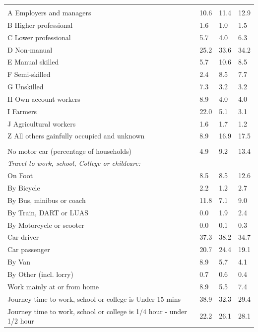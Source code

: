 \documentclass{article}
\begin{document}
\begin{table}[h]
\begin{tabular}{KTTT}
\hline
    \\ 
    \hline
A Employers and managers & 10.6& 11.4& 12.9\\
B Higher professional & 1.6& 1.0& 1.5\\
C Lower professional & 5.7& 4.0& 6.3\\
D Non-manual & 25.2& 33.6& 34.2\\
E Manual skilled &  5.7& 10.6&  8.5\\
F Semi-skilled & 2.4& 8.5& 7.7\\
G Unskilled & 7.3& 3.2& 3.2\\
H Own account workers & 8.9& 4.0& 4.0\\
I Farmers & 22.0&  5.1&  3.1\\
J Agricultural workers & 1.6& 1.7& 1.2\\
Z All others gainfully occupied and unknown &  8.9& 16.9& 17.5\\
\hline
{}\hline
    \\ 
    \hline
No motor car (percentage of households) &  4.9&  9.2& 
13.4\\
    \hline
\emph{Travel to work, school, College or childcare:} & & & \\
\quad On Foot &  8.5&  8.5& 12.6\\
\quad By Bicycle & 2.2& 1.2& 2.7\\
\quad By Bus, minibus or coach & 11.8&  7.1&  9.0\\
\quad By Train, DART or LUAS & 0.0& 1.9& 2.4\\
\quad By Motorcycle or scooter & 0.0& 0.1& 0.3\\
\quad Car driver & 37.3& 38.2& 34.7\\
\quad Car passenger & 20.7& 24.4& 19.1\\
\quad By Van & 8.9& 5.7& 4.1\\
\quad By Other (incl. lorry) & 0.7& 0.6& 0.4\\
    \hline
Work mainly at or from home & 8.9& 5.5& 7.4\\
Journey time to work, school or college is Under 15 mins & 38.9& 32.3& 29.4\\
Journey time to work, school or college is 1/4 hour - under 1/2 hour & 22.2& 26.1& 28.1\\

\end{tabular}
\end{table}
\end{document}
